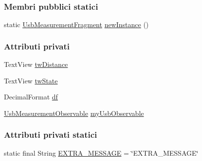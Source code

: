 \subsubsection*{Membri pubblici statici}
\begin{DoxyCompactItemize}
\item 
static \hyperlink{classit_1_1unibo_1_1torsello_1_1bluetoothpositioning_1_1fragment_1_1UsbMeasurementFragment}{Usb\+Measurement\+Fragment} \hyperlink{classit_1_1unibo_1_1torsello_1_1bluetoothpositioning_1_1fragment_1_1UsbMeasurementFragment_a67f1c1cdd2ff81d5345f358dcaf27751_a67f1c1cdd2ff81d5345f358dcaf27751}{new\+Instance} ()
\end{DoxyCompactItemize}
\subsubsection*{Attributi privati}
\begin{DoxyCompactItemize}
\item 
Text\+View \hyperlink{classit_1_1unibo_1_1torsello_1_1bluetoothpositioning_1_1fragment_1_1UsbMeasurementFragment_acf9e7d3122dec27df3e10d7193fa96b3_acf9e7d3122dec27df3e10d7193fa96b3}{tw\+Distance}
\item 
Text\+View \hyperlink{classit_1_1unibo_1_1torsello_1_1bluetoothpositioning_1_1fragment_1_1UsbMeasurementFragment_a730ba64ebd7c0d8fcc8b125aa97202fa_a730ba64ebd7c0d8fcc8b125aa97202fa}{tw\+State}
\item 
Decimal\+Format \hyperlink{classit_1_1unibo_1_1torsello_1_1bluetoothpositioning_1_1fragment_1_1UsbMeasurementFragment_ac5ba3cb6fe1660a73d01bf970c60922b_ac5ba3cb6fe1660a73d01bf970c60922b}{df}
\item 
\hyperlink{classit_1_1unibo_1_1torsello_1_1bluetoothpositioning_1_1observables_1_1UsbMeasurementObservable}{Usb\+Measurement\+Observable} \hyperlink{classit_1_1unibo_1_1torsello_1_1bluetoothpositioning_1_1fragment_1_1UsbMeasurementFragment_adefc2433786f22fffe560fadefec9e2c_adefc2433786f22fffe560fadefec9e2c}{my\+Usb\+Observable}
\end{DoxyCompactItemize}
\subsubsection*{Attributi privati statici}
\begin{DoxyCompactItemize}
\item 
static final String \hyperlink{classit_1_1unibo_1_1torsello_1_1bluetoothpositioning_1_1fragment_1_1UsbMeasurementFragment_a3f7dc91fec5b29690b904a980e5901ab_a3f7dc91fec5b29690b904a980e5901ab}{E\+X\+T\+R\+A\+\_\+\+M\+E\+S\+S\+A\+GE} = \char`\"{}E\+X\+T\+R\+A\+\_\+\+M\+E\+S\+S\+A\+GE\char`\"{}
\end{DoxyCompactItemize}


